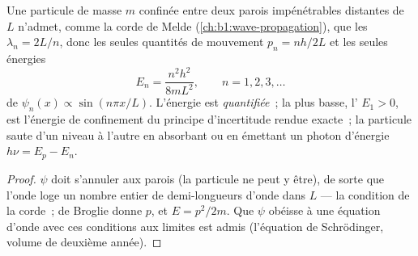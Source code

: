 \begin{proposition}\label{prop:b1:quantum-introduction:box}
Une particule de masse $m$ confinée entre deux parois impénétrables
distantes de $L$ n'admet, comme la corde de Melde
(\cref{ch:b1:wave-propagation}), que les  $\lambda_n = 2L/n$,
donc les seules quantités de mouvement $p_n = nh/2L$ et les seules énergies
\[
E_n = \frac{n^2h^2}{8mL^2} , \qquad n = 1, 2, 3, \ldots
\]
de  $\psi_n(x) \propto \sin(n\pi x/L)$. L'énergie est
\emph{quantifiée}~; la plus basse, l'\emph{} $E_1 > 0$, est
l'énergie de confinement du principe d'incertitude rendue exacte~; la
particule saute d'un niveau à l'autre en absorbant ou en émettant un
photon d'énergie $h\nu = E_p - E_n$.
\end{proposition}

\begin{proof}
$\psi$ doit s'annuler aux parois (la particule ne peut y être), de sorte
que l'onde loge un nombre entier de demi-longueurs d'onde dans $L$ --- la
condition de la corde~; de Broglie donne $p$, et $E = p^2/2m$. Que $\psi$
obéisse à une équation d'onde avec ces conditions aux limites est admis
(l'équation de Schrödinger, volume de deuxième année).
\end{proof}

